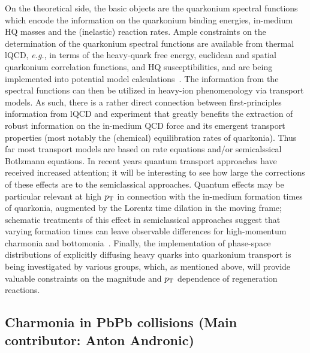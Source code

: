 \documentclass[../report.tex]{subfiles}
\providecommand{\pt}{\ensuremath{p_\text{T}}\Xspace}
\begin{document}
On the theoretical side, the basic objects are the quarkonium spectral functions which 
encode the information on the quarkonium binding energies, in-medium HQ masses and the
(inelastic) reaction rates. Ample constraints on the determination of the quarkonium
spectral functions are available from thermal lQCD, {\it e.g.}, in terms of the heavy-quark
free energy, euclidean and spatial quarkonium correlation functions, and HQ susceptibilities,
and are being implemented into potential model 
calculations~\cite{Wong:2004zr,Mocsy:2005qw,Alberico:2006vw,Brambilla:2008cx,Riek:2010py,Burnier:2015tda,Liu:2017qah}.
The information from the spectral functions can then be utilized in heavy-ion phenomenology
via transport models. As such, there is a rather direct connection between first-principles
information from lQCD and experiment that greatly benefits the extraction of robust information 
on the in-medium QCD force and its emergent transport properties (most notably the (chemical)
equilibration rates of quarkonia). 
Thus far most transport models are based on rate equations and/or
semicalssical Botlzmann equations. In recent years quantum transport approaches have 
received increased attention; it will be interesting to see how large the corrections
of these effects are to the semiclassical approaches. Quantum effects may be particular 
relevant at high $\pt$ in connection with the in-medium formation times of quarkonia, 
augmented by the Lorentz time dilation in the moving frame; schematic treatments of
this effect in semiclassical approaches suggest that varying formation times can leave 
observable differences for high-momentum charmonia and 
bottomonia~\cite{Song:2015bja,Hoelck:2016tqf,Du:2017qkv,Aronson:2017ymv,Krouppa:2017jlg}. 
Finally, the implementation of phase-space distributions of explicitly diffusing heavy quarks 
into quarkonium transport is being investigated by various groups, which, as mentioned above, 
will provide valuable constraints on the magnitude and $\pt$ dependence of regeneration 
reactions.   

\subsection{Charmonia in PbPb collisions (Main contributor: Anton Andronic)}
\end{document}
